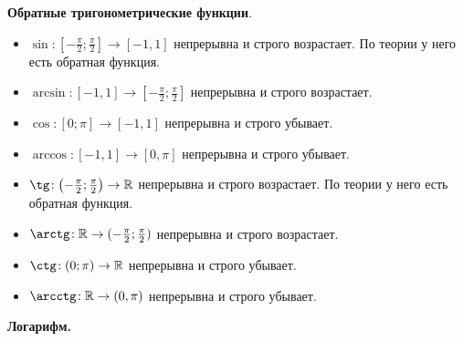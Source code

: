 \textbf{Обратные тригонометрические функции}.
\begin{itemize}
    \item $\sin\!: \left[-\frac{\pi}{2};\frac{\pi}{2}\right] \to [-1, 1]$ непрерывна и строго возрастает. По теории у него есть обратная функция.

\item$\arcsin\!:[-1, 1] \to [-\frac{\pi}{2}; \frac{\pi}{2}]$ непрерывна и строго возрастает.

\item$\cos\!:[0;\pi] \to [-1, 1]$ непрерывна и строго убывает.

\item$\arccos\!: [-1, 1] \to [0, \pi]$ непрерывна и строго убывает.

\item$\tg\!: \left(-\frac{\pi}{2};\frac{\pi}{2}\right) \to \R$ непрерывна и строго возрастает. По теории у него есть обратная функция.

\item$\arctg\!:\R \to (-\frac{\pi}{2}; \frac{\pi}{2})$ непрерывна и строго возрастает.

\item$\ctg\!:(0;\pi) \to \R$ непрерывна и строго убывает.

\item$\arcctg\!: \R \to (0, \pi)$ непрерывна и строго убывает.
\end{itemize}
\textbf{Логарифм.}

